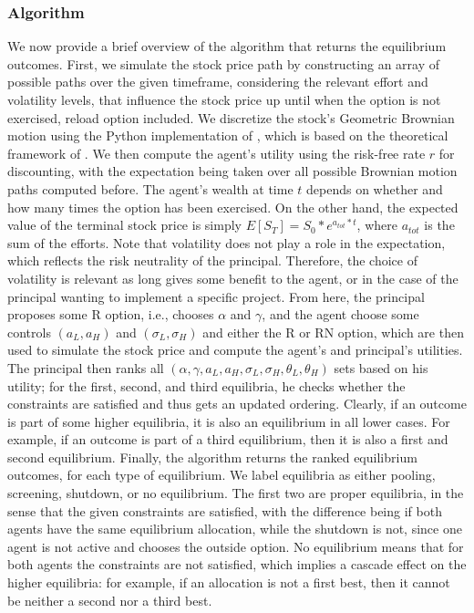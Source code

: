 \subsubsection*{Algorithm}
We now provide a brief overview of the algorithm that returns the equilibrium outcomes. First, we simulate the stock price path by constructing an array of possible paths over the given timeframe, considering the relevant effort and volatility levels, that influence the stock price up until when the option is not exercised, reload option included. We discretize the stock's Geometric Brownian motion using the Python implementation of \cite{qsbrownianpy}, which is based on the theoretical framework of \cite{glasserman2004monte}. %
We then compute the agent's utility using the risk-free rate $r$ for discounting, with the expectation being taken over all possible Brownian motion paths computed before. The agent's wealth at time $t$ depends on whether and how many times the option has been exercised. On the other hand, the expected value of the terminal stock price is simply $E[S_T] = S_0 * e^{a_{tot}*t}$, where $a_{tot}$ is the sum of the efforts. Note that volatility does not play a role in the expectation, which reflects the risk neutrality of the principal. Therefore, the choice of volatility is relevant as long gives some benefit to the agent, or in the case of the principal wanting to implement a specific project.
From here, the principal proposes some R option, i.e., chooses $\alpha$ and $\gamma$, and the agent choose some controls $(a_L, a_H)$ and $(\sigma_L, \sigma_H)$ and either the R or RN option, which are then used to simulate the stock price and compute the agent's and principal's utilities. The principal then ranks all $(\alpha, \gamma, a_L, a_H, \sigma_L, \sigma_H, \theta_L, \theta_H)$ sets based on his utility; for the first, second, and third equilibria, he checks whether the constraints are satisfied and thus gets an updated ordering. Clearly, if an outcome is part of some higher equilibria, it is also an equilibrium in all lower cases. For example, if an outcome is part of a third equilibrium, then it is also a first and second equilibrium. Finally, the algorithm returns the ranked equilibrium outcomes, for each type of equilibrium. We label equilibria as either pooling, screening, shutdown, or no equilibrium. The first two are proper equilibria, in the sense that the given constraints are satisfied, with the difference being if both agents have the same equilibrium allocation, while the shutdown is not, since one agent is not active and chooses the outside option. No equilibrium means that for both agents the constraints are not satisfied, which implies a cascade effect on the higher equilibria: for example, if an allocation is not a first best, then it cannot be neither a second nor a third best.


